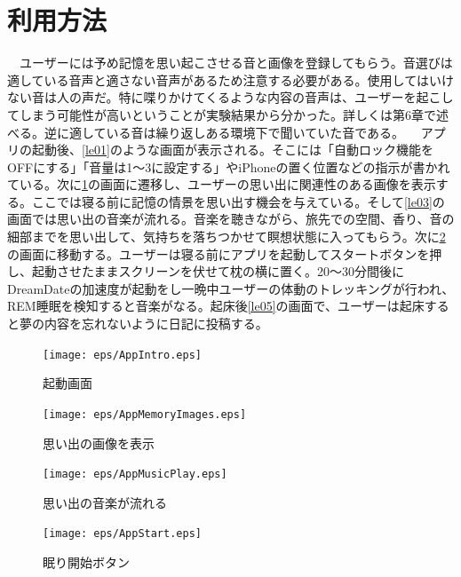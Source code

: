 \section{利用方法}
　ユーザーには予め記憶を思い起こさせる音と画像を登録してもらう。音選びは適している音声と適さない音声があるため注意する必要がある。使用してはいけない音は人の声だ。特に喋りかけてくるような内容の音声は、ユーザーを起こしてしまう可能性が高いということが実験結果から分かった。詳しくは第6章で述べる。逆に適している音は繰り返しある環境下で聞いていた音である。
　アプリの起動後、\ref{le01}のような画面が表示される。そこには「自動ロック機能をOFFにする」「音量は1〜3に設定する」やiPhoneの置く位置などの指示が書かれている。次に\ref{le02}の画面に遷移し、ユーザーの思い出に関連性のある画像を表示する。ここでは寝る前に記憶の情景を思い出す機会を与えている。そして\ref{le03}の画面では思い出の音楽が流れる。音楽を聴きながら、旅先での空間、香り、音の細部までを思い出して、気持ちを落ちつかせて瞑想状態に入ってもらう。次に\ref{le04}の画面に移動する。ユーザーは寝る前にアプリを起動してスタートボタンを押し、起動させたままスクリーンを伏せて枕の横に置く。20〜30分間後にDreamDateの加速度が起動をし一晩中ユーザーの体動のトレッキングが行われ、REM睡眠を検知すると音楽がなる。起床後\ref{le05}の画面で、ユーザーは起床すると夢の内容を忘れないように日記に投稿する。

\begin{figure}[htbp]
 \begin{minipage}{0.45\hsize}
  \begin{center}
   \texttt{[image: eps/AppIntro.eps]}
  \end{center}
  \caption{起動画面}
  \label{le01}
 \end{minipage}
 \begin{minipage}{0.45\hsize}
  \begin{center}
   \texttt{[image: eps/AppMemoryImages.eps]}
  \end{center}
  \caption{思い出の画像を表示}
  \label{le02}
 \end{minipage}
\end{figure}

\begin{figure}[htbp]
 \begin{minipage}{0.45\hsize}
  \begin{center}
   \texttt{[image: eps/AppMusicPlay.eps]}
  \end{center}
  \caption{思い出の音楽が流れる}
  \label{le03}
 \end{minipage}
 \begin{minipage}{0.45\hsize}
  \begin{center}
   \texttt{[image: eps/AppStart.eps]}
  \end{center}
  \caption{眠り開始ボタン}
  \label{le04}
 \end{minipage}
\end{figure}

